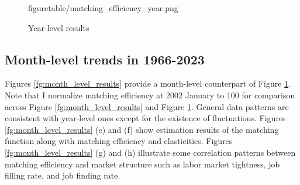 \documentclass[12pt]{article}
\begin{document}
\begin{figure}[!ht]
\begin{center}
{  {figuretable/matching_efficiency_year.png}}
  \\
  \caption{Year-level results}
  \label{fg:year_level_results} 
  \end{center}
  \footnotesize
\end{figure} 


\subsection{Month-level trends in 1966-2023}

Figures \ref{fg:month_level_results} provide a month-level counterpart of Figure \ref{fg:year_level_results}. 
Note that I normalize matching efficiency at 2002 January to 100 for comparison across Figure \ref{fg:month_level_results} and Figure \ref{fg:year_level_results}.
General data patterns are consistent with year-level ones except for the existence of fluctuations.
Figures \ref{fg:month_level_results} (e) and (f) show estimation results of the matching function along with matching efficiency and elasticities.
Figures \ref{fg:month_level_results} (g) and (h) illustrate some correlation patterns between matching efficiency and market structure such as labor market tightness, job filling rate, and job finding rate.
\end{document}
